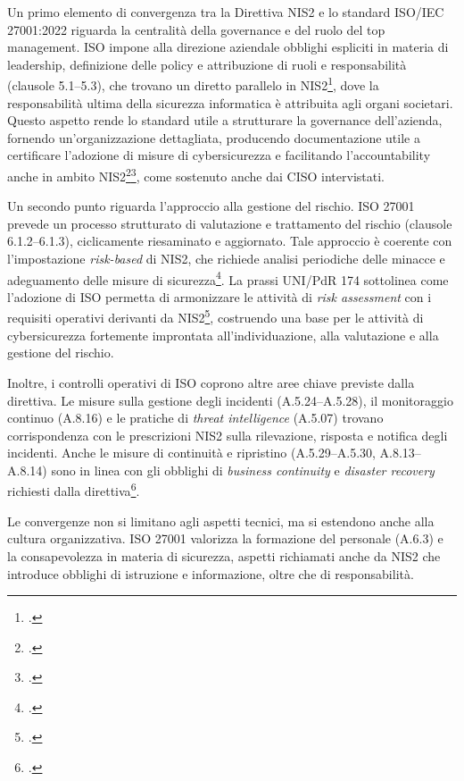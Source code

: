 Un primo elemento di convergenza tra la Direttiva NIS2 e lo standard ISO/IEC 27001:2022 riguarda la centralità della governance e del ruolo del top management.
ISO impone alla direzione aziendale obblighi espliciti in materia di leadership, definizione delle policy e attribuzione di ruoli e responsabilità 
(clausole 5.1--5.3), che trovano un diretto parallelo in NIS2\footcite[artt. 20--21]{nis2-directive}, dove la responsabilità 
ultima della sicurezza informatica è attribuita agli organi societari.
Questo aspetto rende lo standard utile a strutturare la governance dell'azienda, fornendo un'organizzazione dettagliata, producendo documentazione
utile a certificare l'adozione di misure di cybersicurezza e facilitando l’accountability anche in ambito NIS2\footcite[pp. 56--58]{kouns-ciso}\footcite[p. 35]{ecso-whitepaper-nis2}, 
come sostenuto anche dai CISO intervistati.

Un secondo punto riguarda l'approccio alla gestione del rischio. ISO 27001 prevede un processo strutturato di valutazione e trattamento del rischio 
(clausole 6.1.2--6.1.3), ciclicamente riesaminato e aggiornato. Tale approccio è coerente con l’impostazione 
\textit{risk-based} di NIS2, che richiede analisi periodiche delle minacce e adeguamento delle misure di sicurezza\footcite[art. 21(2)]{nis2-directive}. 
La prassi UNI/PdR 174 sottolinea come l’adozione di ISO permetta di armonizzare le attività di \textit{risk assessment} con i requisiti operativi 
derivanti da NIS2\footcite[p. 9]{uni-pdr174}, costruendo una base per le attività di cybersicurezza fortemente improntata all'individuazione, 
alla valutazione e alla gestione del rischio.

Inoltre, i controlli operativi di ISO coprono altre aree chiave previste dalla direttiva. Le misure sulla gestione degli incidenti (A.5.24--A.5.28), 
il monitoraggio continuo (A.8.16) e le pratiche di \textit{threat intelligence} (A.5.07) trovano corrispondenza con le prescrizioni NIS2 sulla rilevazione, 
risposta e notifica degli incidenti. Anche le misure di continuità e ripristino (A.5.29--A.5.30, A.8.13--A.8.14) sono 
in linea con gli obblighi di \textit{business continuity} e \textit{disaster recovery} richiesti dalla direttiva\footcite[p. 5]{ecso-whitepaper-nis2}.

Le convergenze non si limitano agli aspetti tecnici, ma si estendono anche alla cultura organizzativa. ISO 27001 valorizza la formazione del personale (A.6.3) 
e la consapevolezza in materia di sicurezza, aspetti richiamati anche da NIS2 che introduce obblighi di istruzione e informazione,
oltre che di responsabilità.

